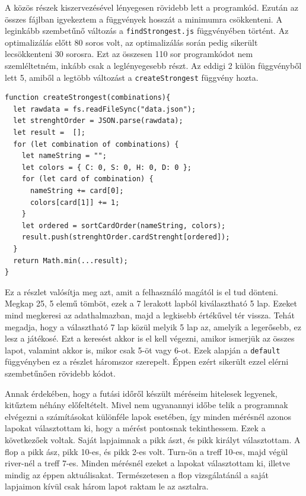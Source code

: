 A közös részek kiszervezésével lényegesen rövidebb lett a programkód. Ezután az összes fájlban igyekeztem a függvények hosszát a minimumra csökkenteni. A leginkább szembetűnő változás a \texttt{findStrongest.js} függvényében történt. Az optimalizálás előtt 80 soros volt, az optimalizálás során pedig sikerült lecsökkenteni 30 sorosra. Ezt az összesen 110 sor programkódot nem szemléltetném, inkább csak a leglényegesebb részt. Az eddigi 2 külön függvényből lett 5, amiből a legtöbb változást a \texttt{createStrongest} függvény hozta.

\newpage

\begin{lstlisting}[style=htmlcssjs]
function createStrongest(combinations){
  let rawdata = fs.readFileSync("data.json");
  let strenghtOrder = JSON.parse(rawdata);
  let result =  [];
  for (let combination of combinations) {
    let nameString = "";
    let colors = { C: 0, S: 0, H: 0, D: 0 };
    for (let card of combination) {
      nameString += card[0];
      colors[card[1]] += 1;
    }
    let ordered = sortCardOrder(nameString, colors);
    result.push(strenghtOrder.cardStrenght[ordered]);
  }
  return Math.min(...result);
}
\end{lstlisting}

Ez a részlet valósítja meg azt, amit a felhasználó magától is el tud dönteni. Megkap 25, 5 elemű tömböt, ezek a 7 lerakott lapból kiválasztható 5 lap. Ezeket mind megkeresi az adathalmazban, majd a legkisebb értékűvel tér vissza. Tehát megadja, hogy a választható 7 lap közül melyik 5 lap az, amelyik a legerősebb, ez lesz a játékosé. Ezt a keresést akkor is el kell végezni, amikor ismerjük az összes lapot, valamint akkor is, mikor csak 5-öt vagy 6-ot. Ezek alapján a \texttt{default} függvényben ez a részlet háromszor szerepelt. Éppen ezért sikerült ezzel elérni szembetűnően rövidebb kódot.


Annak érdekében, hogy a futási időről készült méréseim hitelesek legyenek, kitűztem néhány előfeltételt. Mivel nem ugyanannyi időbe telik a programnak elvégezni a számításokat különféle lapok esetében, így minden mérésnél azonos lapokat választottam ki, hogy a mérést pontosnak tekinthessem. Ezek a következőek voltak. Saját lapjaimnak a pikk ászt, és pikk királyt választottam. A flop a pikk ász, pikk 10-es, és pikk 2-es volt. Turn-ön a treff 10-es, majd végül river-nél a treff 7-es. Minden mérésnél ezeket a lapokat választottam ki, illetve mindig az éppen aktuálisakat. Természetesen a flop vizsgálatánál a saját lapjaimon kívül csak három lapot raktam le az asztalra.

